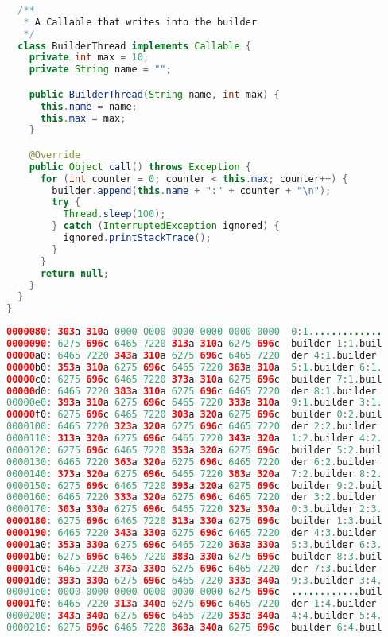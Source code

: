 \begin{lstlisting}[language=Java]
  
  /**
   * A Callable that writes into the builder
   */
  class BuilderThread implements Callable {
    private int max = 10;
    private String name = "";

    public BuilderThread(String name, int max) {
      this.name = name;
      this.max = max;
    }

    @Override
    public Object call() throws Exception {
      for (int counter = 0; counter < this.max; counter++) {
        builder.append(this.name + ":" + counter + "\n");
        try {
          Thread.sleep(100);
        } catch (InterruptedException ignored) {
          ignored.printStackTrace();
        }
      }
      return null;
    }
  }
}
\end{lstlisting}

\begin{lstlisting}[language=Java]
0000080: 303a 310a 0000 0000 0000 0000 0000 0000  0:1.............
0000090: 6275 696c 6465 7220 313a 310a 6275 696c  builder 1:1.buil
00000a0: 6465 7220 343a 310a 6275 696c 6465 7220  der 4:1.builder
00000b0: 353a 310a 6275 696c 6465 7220 363a 310a  5:1.builder 6:1.
00000c0: 6275 696c 6465 7220 373a 310a 6275 696c  builder 7:1.buil
00000d0: 6465 7220 383a 310a 6275 696c 6465 7220  der 8:1.builder
00000e0: 393a 310a 6275 696c 6465 7220 333a 310a  9:1.builder 3:1.
00000f0: 6275 696c 6465 7220 303a 320a 6275 696c  builder 0:2.buil
0000100: 6465 7220 323a 320a 6275 696c 6465 7220  der 2:2.builder
0000110: 313a 320a 6275 696c 6465 7220 343a 320a  1:2.builder 4:2.
0000120: 6275 696c 6465 7220 353a 320a 6275 696c  builder 5:2.buil
0000130: 6465 7220 363a 320a 6275 696c 6465 7220  der 6:2.builder
0000140: 373a 320a 6275 696c 6465 7220 383a 320a  7:2.builder 8:2.
0000150: 6275 696c 6465 7220 393a 320a 6275 696c  builder 9:2.buil
0000160: 6465 7220 333a 320a 6275 696c 6465 7220  der 3:2.builder
0000170: 303a 330a 6275 696c 6465 7220 323a 330a  0:3.builder 2:3.
0000180: 6275 696c 6465 7220 313a 330a 6275 696c  builder 1:3.buil
0000190: 6465 7220 343a 330a 6275 696c 6465 7220  der 4:3.builder
00001a0: 353a 330a 6275 696c 6465 7220 363a 330a  5:3.builder 6:3.
00001b0: 6275 696c 6465 7220 383a 330a 6275 696c  builder 8:3.buil
00001c0: 6465 7220 373a 330a 6275 696c 6465 7220  der 7:3.builder
00001d0: 393a 330a 6275 696c 6465 7220 333a 340a  9:3.builder 3:4.
00001e0: 0000 0000 0000 0000 0000 0000 6275 696c  ............buil
00001f0: 6465 7220 313a 340a 6275 696c 6465 7220  der 1:4.builder
0000200: 343a 340a 6275 696c 6465 7220 353a 340a  4:4.builder 5:4.
0000210: 6275 696c 6465 7220 363a 340a 6275 696c  builder 6:4.buil

\end{lstlisting}
